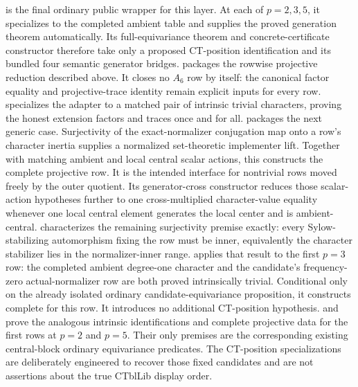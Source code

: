 \documentclass[11pt]{article}
\begin{document}
 is the final
ordinary public wrapper for this layer.  At each of \(p=2,3,5\), it
specializes to the completed ambient table and supplies the proved
generation theorem automatically.  Its full-equivariance theorem and
concrete-certificate constructor therefore take only a proposed
CT-position identification and its bundled four semantic generator
bridges.
 packages the rowwise
projective reduction described above.  It closes no \(A_6\) row by itself:
the canonical factor equality and projective-trace identity remain
explicit inputs for every row.
 specializes the adapter to
a matched pair of intrinsic trivial characters, proving the honest
extension factors and traces once and for all.
 packages the next generic
case.  Surjectivity of the exact-normalizer conjugation map onto a row's
character inertia supplies a normalized set-theoretic implementer lift.
Together with matching ambient and local central scalar actions, this
constructs the complete projective row.  It is the intended interface for
nontrivial rows moved freely by the outer quotient.  Its generator-cross
constructor reduces those scalar-action hypotheses further to one
cross-multiplied character-value equality whenever one local central
element generates the local center and is ambient-central.
 characterizes
the remaining surjectivity premise exactly: every Sylow-stabilizing
automorphism fixing the row must be inner, equivalently the character
stabilizer lies in the normalizer-inner range.
 applies that result to
the first \(p=3\) row: the completed ambient degree-one character and the
candidate's frequency-zero actual-normalizer row are both proved
intrinsically trivial.  Conditional only on the already isolated ordinary
candidate-equivariance proposition, it constructs complete
 for this row.  It introduces no
additional CT-position hypothesis.
 and
 prove the analogous
intrinsic identifications and complete projective data for the first rows
at \(p=2\) and \(p=5\).  Their only premises are the corresponding existing
central-block ordinary equivariance predicates.  The CT-position
specializations are deliberately engineered to recover those fixed
candidates and are not assertions about the true CTblLib display order.
\end{document}
